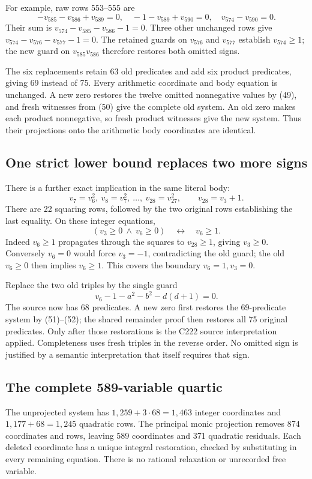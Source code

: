For example, raw rows 553--555 are
\[
-v_{585}-v_{586}+v_{589}=0,\quad
-1-v_{589}+v_{590}=0,\quad v_{574}-v_{590}=0.
\]
Their sum is $v_{574}-v_{585}-v_{586}-1=0$.
Three other unchanged rows give
$v_{574}-v_{576}-v_{577}-1=0$.
The retained guards on $v_{576}$ and $v_{577}$ establish $v_{574}\ge1$;
the new guard on $v_{585}v_{586}$ therefore restores both omitted signs.

The six replacements retain 63 old predicates and add six product
predicates, giving 69 instead of 75.
Every arithmetic coordinate and body equation is unchanged.
A new zero restores the twelve omitted nonnegative values by (49), and
fresh witnesses from (50) give the complete old system.
An old zero makes each product nonnegative, so fresh product witnesses
give the new system.
Thus their projections onto the arithmetic body coordinates are identical.

\subsection{One strict lower bound replaces two more signs}

There is a further exact implication in the same literal body:
\[
v_7=v_6^2,\ v_8=v_7^2,\ \ldots,\ v_{28}=v_{27}^2,\qquad
v_{28}=v_3+1.
\tag{51}
\]
There are 22 squaring rows, followed by the two original rows establishing
the last equality. On these integer equations,
\[
(v_3\ge0\ \land\ v_6\ge0)\quad\longleftrightarrow\quad v_6\ge1.
\tag{52}
\]
Indeed $v_6\ge1$ propagates through the squares to $v_{28}\ge1$,
giving $v_3\ge0$. Conversely $v_6=0$ would force $v_3=-1$,
contradicting the old guard; the old $v_6\ge0$ then implies $v_6\ge1$.
This covers the boundary $v_6=1,v_3=0$.

Replace the two old triples by the single guard
\[
v_6-1-a^2-b^2-d(d+1)=0.
\tag{53}
\]
The source now has 68 predicates.
A new zero first restores the 69-predicate system by (51)--(52);
the shared remainder proof then restores all 75 original predicates.
Only after those restorations is the C222 source interpretation applied.
Completeness uses fresh triples in the reverse order.
No omitted sign is justified by a semantic interpretation that itself
requires that sign.

\subsection{The complete 589-variable quartic}

The unprojected system has $1,259+3\cdot68=1,463$ integer coordinates and
$1,177+68=1,245$ quadratic rows.
The principal monic projection removes 874 coordinates and rows,
leaving 589 coordinates and 371 quadratic residuals.
Each deleted coordinate has a unique integral restoration, checked by
substituting in every remaining equation.
There is no rational relaxation or unrecorded free variable.

